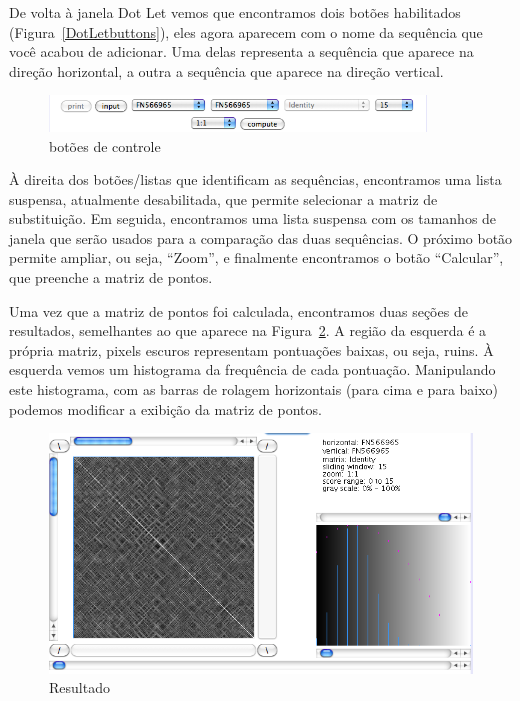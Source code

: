 \documentclass[letter,11pt]{book}
\begin{document}
De volta à janela Dot Let vemos que encontramos dois botões habilitados (Figura~\ref{DotLetbuttons}), eles agora aparecem com o nome da sequência que você acabou de adicionar. Uma delas representa a sequência que aparece na direção horizontal, a outra a sequência que aparece na direção vertical.

\begin{figure}[ht]
\centering
   \includegraphics[width=10cm]{Figs/DotLetBotones.png}
  \caption{\label{DotLetbotones}botões de controle}
\end{figure}


À direita dos botões/listas que identificam as sequências, encontramos uma lista suspensa, atualmente desabilitada, que permite selecionar a matriz de substituição. Em seguida, encontramos uma lista suspensa com os tamanhos de janela que serão usados para a comparação das duas sequências. O próximo botão permite ampliar, ou seja, ``Zoom'', e finalmente encontramos o botão ``Calcular'', que preenche a matriz de pontos.

Uma vez que a matriz de pontos foi calculada, encontramos duas seções de resultados, semelhantes ao que aparece na Figura~\ref{DotLetResultado1}. A região da esquerda é a própria matriz, pixels escuros representam pontuações baixas, ou seja, ruins. À esquerda vemos um histograma da frequência de cada pontuação. Manipulando este histograma, com as barras de rolagem horizontais (para cima e para baixo) podemos modificar a exibição da matriz de pontos.

\begin{figure}[ht]
\centering
   \includegraphics[width=15cm]{Figs/DotLetResultado1.png}
  \caption{\label{DotLetResultado1}Resultado}
\end{figure}
\end{document}
